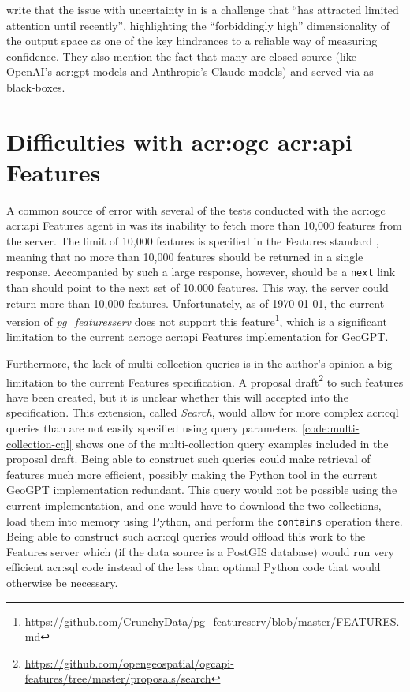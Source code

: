 \citep[1-2]{linGeneratingConfidenceUncertainty2023} write that the issue with uncertainty in  is a challenge that \enquote{has attracted limited attention until recently}, highlighting the \enquote{forbiddingly high} dimensionality of the output space as one of the key hindrances to a reliable way of measuring confidence. They also mention the fact that many  are closed-source (like OpenAI's \acrshort{acr:gpt} models and Anthropic's Claude models) and served via  as black-boxes.

\section[Difficulties with OGC API Features]{Difficulties with \acrshort{acr:ogc} \acrshort{acr:api} Features}
\label{sec:difficulties-with-oaf}

A common source of error with several of the tests conducted with the \acrshort{acr:ogc} \acrshort{acr:api} Features agent in was its inability to fetch more than 10,000 features from the server. The limit of 10,000 features is specified in the Features standard \citep{opengeospatialconsortiumOGCAPIFeatures2022}, meaning that no more than 10,000 features should be returned in a single response. Accompanied by such a large response, however, should be a \texttt{next} link than should point to the next set of 10,000 features. This way, the server could return more than 10,000 features. Unfortunately, as of \today, the current version of \textit{pg\_featuresserv} does not support this feature\footnote{\url{https://github.com/CrunchyData/pg_featureserv/blob/master/FEATURES.md}}, which is a significant limitation to the current \acrshort{acr:ogc} \acrshort{acr:api} Features implementation for GeoGPT.

Furthermore, the lack of multi-collection queries is in the author's opinion a big limitation to the current Features specification. A proposal draft\footnote{\url{https://github.com/opengeospatial/ogcapi-features/tree/master/proposals/search}} to such features have been created, but it is unclear whether this will accepted into the specification. This extension, called \textit{Search}, would allow for more complex \acrshort{acr:cql} queries than are not easily specified using query parameters. \autoref{code:multi-collection-cql} shows one of the multi-collection query examples included in the proposal draft. Being able to construct such queries could make retrieval of features much more efficient, possibly making the Python tool in the current GeoGPT implementation redundant. This query would not be possible using the current implementation, and one would have to download the two collections, load them into memory using Python, and perform the \texttt{contains} operation there. Being able to construct such \acrshort{acr:cql} queries would offload this work to the Features server which (if the data source is a PostGIS database) would run very efficient \acrshort{acr:sql} code instead of the less than optimal Python code that would otherwise be necessary.

